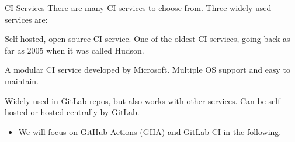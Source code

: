 \begin{frame}[fragile]{CI Services}
  There are many CI services to choose from. Three widely used services are:
  \begin{description}
    \setlength{\itemsep}{1em}
    \item[Jenkins] Self-hosted, open-source CI service. One of the oldest CI services,
      going back as far as 2005 when it was called Hudson.
    \item[GitHub Actions] A modular CI service developed by Microsoft. Multiple OS
      support and easy to maintain.
    \item[GitLab CI] Widely used in GitLab repos, but also works with
      other services. Can be self-hosted or hosted centrally by GitLab.
  \end{description}
  \begin{itemize}
    \item We will focus on GitHub Actions (GHA) and GitLab CI in the following.
  \end{itemize}
\end{frame}


